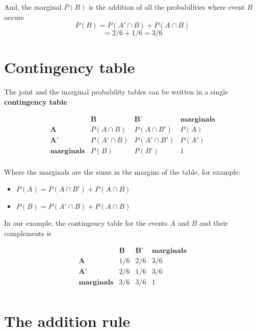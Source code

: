 \documentclass[
]{book}
\providecommand{\tightlist}{%
  \setlength{\itemsep}{0pt}\setlength{\parskip}{0pt}}
\begin{document}
And, the marginal \(P(B)\) is the addition of all the probabilities where event \(B\) occurs \[P(B)=P(A'\cap B) +P(A \cap B)\] \[=2/6+1/6=3/6\]

\hypertarget{contingency-table}{%
\section{Contingency table}\label{contingency-table}}

The joint and the marginal probability tables can be written in a single \textbf{contingency table}

\[
\begin{array}{ccc|c}
           & \mathbf{B}             & \mathbf{B'}             & \mathbf{marginals} \\ 
\mathbf{A}        & P(A \cap B)   & P(A \cap B')   & P(A)       \\ 
\mathbf{A'}       & P(A' \cap B)  & P(A' \cap B')  & P(A')      \\ \hline
\mathbf{marginals} & P(B)        & P(B')         & 1            \\ 
\end{array}
\]

Where the marginals are the sums in the margins of the table, for example:

\begin{itemize}
\tightlist
\item
  \(P(A)=P(A \cap B') + P(A \cap B)\)
\item
  \(P(B)=P(A' \cap B) + P(A \cap B)\)
\end{itemize}

In our example, the contingency table for the events \(A\) and \(B\) and their complements is

\[
\begin{array}{ccc|c}
           & \mathbf{B}             & \mathbf{B'}             & \mathbf{marginals} \\ 
\mathbf{A}        & 1/6   & 2/6   & 3/6       \\ 
\mathbf{A'}       & 2/6  & 1/6   & 3/6     \\ \hline
\mathbf{marginals} & 3/6        & 3/6         & 1            \\ 
\end{array}
\]

\hypertarget{the-addition-rule}{%
\section{The addition rule}\label{the-addition-rule}}
\end{document}
